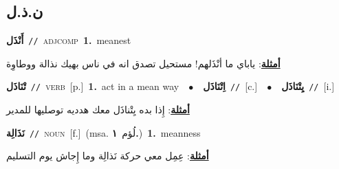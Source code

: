 \documentclass[10pt,a4paper,twoside]{article} %
\begin{document}
\begin{multicols}{2}
\vspace{-3mm}
\subsection*{\color{blue}\foreignlanguage{arabic}{ن.ذ.ل}\color{blue}{}} 

{\setlength\topsep{0pt}\textbf{\foreignlanguage{arabic}{أَنْذَل}}\ {\color{gray}\texttt{//}\color{black}}\ \textsc{adj\textunderscore comp}\ \textbf{1.}~meanest\  \begin{flushright}\color{gray}\foreignlanguage{arabic}{\textbf{\underline{\foreignlanguage{arabic}{أمثلة}}}: ياباي ما أنْذَلهم! مستحيل تصدق انه في ناس بهيك نذالة ووطاوِة}\end{flushright}\color{black}} \vspace{2mm}

{\setlength\topsep{0pt}\textbf{\foreignlanguage{arabic}{تْنَاذَل}}\ {\color{gray}\texttt{//}\color{black}}\ \textsc{verb}\ [p.]\ \textbf{1.}~act in a mean way\ \ $\bullet$\ \ \setlength\topsep{0pt}\textbf{\foreignlanguage{arabic}{اِتْنَاذَل}}\ {\color{gray}\texttt{//}\color{black}}\ [c.]\ \ $\bullet$\ \ \setlength\topsep{0pt}\textbf{\foreignlanguage{arabic}{يِتْنَاذَل}}\ {\color{gray}\texttt{//}\color{black}}\ [i.]\  \begin{flushright}\color{gray}\foreignlanguage{arabic}{\textbf{\underline{\foreignlanguage{arabic}{أمثلة}}}: إِذا بده يِتْناذَل معك هدديه توصليها للمدير}\end{flushright}\color{black}} \vspace{2mm}

{\setlength\topsep{0pt}\textbf{\foreignlanguage{arabic}{نَذَالِة}}\ {\color{gray}\texttt{//}\color{black}}\ \textsc{noun}\ [f.]\ \color{gray}(msa. \foreignlanguage{arabic}{لُؤم}~\foreignlanguage{arabic}{\textbf{١.}})\color{black}\ \textbf{1.}~meanness\  \begin{flushright}\color{gray}\foreignlanguage{arabic}{\textbf{\underline{\foreignlanguage{arabic}{أمثلة}}}: عِمِل معي حركة نَذالِة وما إِجاش يوم التسليم}\end{flushright}\color{black}} \vspace{2mm}


\end{multicols}
\end{document}
